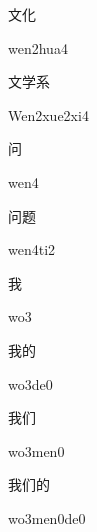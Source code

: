 \begin{verbete}{文化}
\begin{pronuncia}{wen2hua4}
\end{pronuncia}
\end{verbete}

\begin{verbete}{文学系}
\begin{pronuncia}{Wen2xue2xi4}
\end{pronuncia}
\end{verbete}

\begin{verbete}[wen4]{问}
\begin{pronuncia}{wen4}
\end{pronuncia}
\end{verbete}

\begin{verbete}[wen4ti2]{问题}
\begin{pronuncia}{wen4ti2}
\end{pronuncia}
\end{verbete}

\begin{verbete}[wo3]{我}
\begin{pronuncia}{wo3}
\end{pronuncia}
\end{verbete}

\begin{verbete}[wo3de0]{我的}
\begin{pronuncia}{wo3de0}
\end{pronuncia}
\end{verbete}

\begin{verbete}[wo3men0]{我们}
\begin{pronuncia}{wo3men0}
\end{pronuncia}
\end{verbete}

\begin{verbete}[wo3men0de0]{我们的}
\begin{pronuncia}{wo3men0de0}
\end{pronuncia}
\end{verbete}

